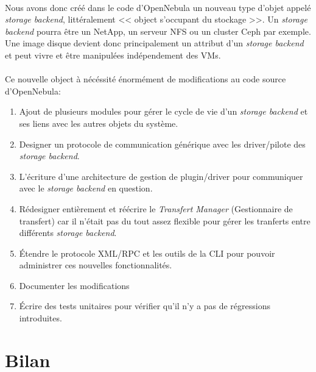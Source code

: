 \paragraph*{}
Nous avons donc créé dans le code d'OpenNebula un nouveau type d'objet appelé \emph{storage backend}, littéralement << object s'occupant du stockage >>.
Un \emph{storage backend} pourra être un NetApp, un serveur NFS ou un cluster Ceph par exemple. Une image disque devient donc principalement un attribut d'un
\emph{storage backend} et peut vivre et être manipulées indépendement des VMs.\\


\paragraph*{}
Ce nouvelle object à nécéssité énormément de modifications au code source d'OpenNebula:
\begin{enumerate}
	\item Ajout de plusieurs modules pour gérer le cycle de vie d'un \emph{storage backend} et ses liens avec les autres objets du système.
	\item Designer un protocole de communication générique avec les driver/pilote des \emph{storage backend}.
	\item L'écriture d'une architecture de gestion de plugin/driver pour communiquer avec le \emph{storage backend} en question.
	\item Rédesigner entièrement et réécrire le \emph{Transfert Manager} (Gestionnaire de transfert) car il n'était pas du tout assez flexible
		pour gérer les tranferts entre différents \emph{storage backend}.
	\item Étendre le protocole XML/RPC et les outils de la CLI pour pouvoir administrer ces nouvelles fonctionnalités.
	\item Documenter les modifications
	\item Écrire des tests unitaires pour vérifier qu'il n'y a pas de régressions introduites.
\end{enumerate}

\section{Bilan}

\paragraph*{}









